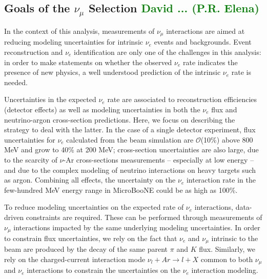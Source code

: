 \documentclass[a4paper]{article}
\begin{document}
\subsection{Goals of the $\nu_{\mu}$ Selection \textcolor{green}{David   ... (P.R. Elena)}}
\label{ssec:goalsofnumusel}

\par In the context of this analysis, measurements of $\nu_{\mu}$ interactions are aimed at reducing modeling uncertainties for intrinsic $\nu_e$ events and backgrounds. Event reconstruction and $\nu_e$ identification are only one of the challenges in this analysis:  in order to make statements on whether the observed $\nu_e$ rate indicates the presence of new physics, a well understood prediction of the intrinsic $\nu_e$ rate is needed. 

\par Uncertainties in the expected $\nu_e$ rate are associated to reconstruction efficiencies (detector effects) as well as modeling uncertainties in both the $\nu_e$ flux  and neutrino-argon cross-section predictions. Here, we focus on describing the strategy to deal with the latter. In the case of a single detector experiment, %
flux uncertainties for $\nu_e$ calculated from the beam simulation are $\mathcal{O}$(10\%) above 800 MeV and grow to 40\% at 200 MeV;  cross-section uncertainties are also large, due to the scarcity of $\nu$-Ar cross-sections measurements -- especially at low energy -- and due to the complex modeling of neutrino interactions on heavy targets such as argon. Combining all effects, the uncertainty on the $\nu_e$ interaction rate in the few-hundred MeV energy range in MicroBooNE could be as high as 100\%.
\par To reduce modeling uncertainties on the expected rate of $\nu_e$ interactions, data-driven constraints are required. These can be performed through measurements of $\nu_{\mu}$ interactions impacted by the same underlying modeling uncertainties. In order to constrain flux uncertainties, we rely on the fact that $\nu_e$ and $\nu_{\mu}$ intrinsic to the beam are produced by the decay of the same parent $\pi$ and $K$ flux. Similarly, we rely on the charged-current interaction mode $\nu_{l} + Ar \rightarrow l + X$ common to both $\nu_{\mu}$ and $\nu_e$ interactions to constrain the uncertainties on the $\nu_e$ interaction modeling.
\end{document}
